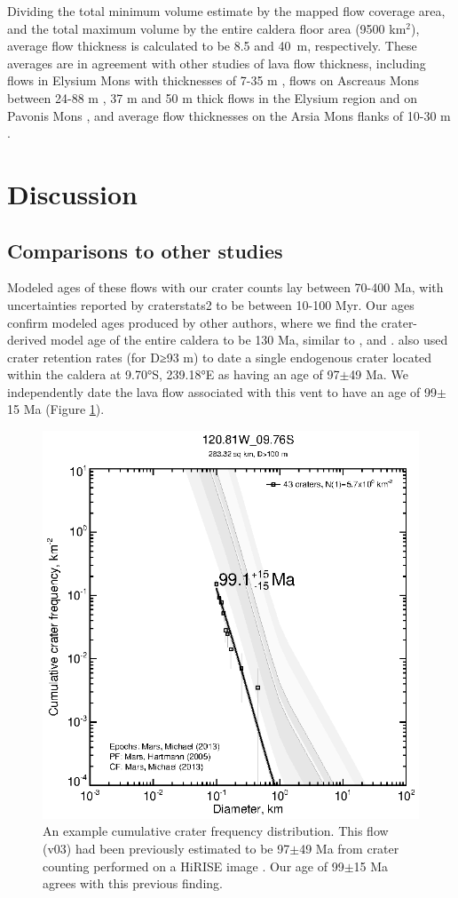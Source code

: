 \documentclass[12pt,letter]{article}
\begin{document}
Dividing the total minimum volume estimate by the mapped flow coverage area, and the total maximum volume by the entire caldera floor area (9500 km$^2$), average flow thickness is calculated to be 8.5 and 40~m, respectively. These averages are in agreement with other studies of lava flow thickness, including flows  in Elysium Mons with thicknesses of 7-35 m \citep{pasckert2012rheologies}, flows on Ascreaus Mons between 24-88 m \citep{hiesinger2007young}, 37 m and 50 m thick flows in the Elysium region and on Pavonis Mons \citep{glaze2003methodology,baloga2003rheology}, and average flow thicknesses on the Arsia Mons flanks of 10-30 m \citep{mouginis2008lava}.

\section{Discussion}

\subsection{Comparisons to other studies}

Modeled ages of these flows with our crater counts lay between 70-400 Ma, with uncertainties reported by craterstats2 to be between 10-100 Myr. Our ages confirm modeled ages produced by other authors, where we find the crater-derived model age of the entire caldera to be 130 Ma, similar to  \citet{neukum2004recent}, \citet{werner2009global} and \citep{robbins2011volcanic}. \citet{robbins2011volcanic} also used crater retention rates (for D≥93 m) to date a single endogenous crater located within the caldera at 9.70°S, 239.18°E as having an age of 97$\pm$49 Ma. We independently date the lava flow associated with this vent to have an age of 99$\pm$15 Ma (Figure \ref{fig_craterct}).


\begin{figure}
\centering
\includegraphics[width=0.5\linewidth]{figures/craterstats/120-81W_09-76S_100m_cum.eps}
\caption{An example cumulative crater frequency distribution. This flow (v03) had been previously estimated to be 97$\pm$49 Ma from crater counting performed on a HiRISE image \citep{robbins2011volcanic}. Our age of 99$\pm$15 Ma agrees with this previous finding.}
\label{fig_craterct}
\end{figure}
\end{document}
